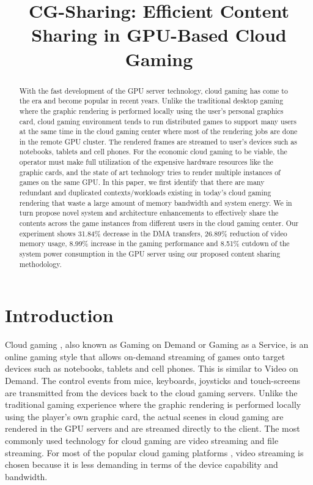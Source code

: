 \documentclass[pageno]{jpaper}
\begin{document}
\title{CG-Sharing: Efficient Content Sharing in GPU-Based Cloud Gaming}

\date{}
\maketitle


\begin{abstract}
With the fast development of the GPU server technology, cloud gaming has come to the era and become popular in recent years. Unlike the traditional desktop gaming where the graphic rendering is performed locally using the user's personal graphics card, cloud gaming environment tends to run distributed games to support many users at the same time in the cloud gaming center where most of the rendering jobs are done in the remote GPU cluster. The rendered frames are streamed to user's devices such as notebooks, tablets and cell phones. For the economic cloud gaming to be viable, the operator must make full utilization of the expensive hardware resources like the graphic cards, and the state of art technology tries to render multiple instances of games on the same GPU. In this paper, we first identify that there are many redundant and duplicated contexts/workloads existing in today's cloud gaming rendering that waste a large amount of memory bandwidth and system energy. We in turn propose novel system and architecture enhancements to effectively share the contents across the game instances from different users in the cloud gaming center. Our experiment shows 31.84\% decrease in the DMA transfers, 26.89\% reduction of video memory usage, 8.99\% increase in the gaming performance and 8.51\% cutdown of the system power consumption in the GPU server using our proposed content sharing methodology.
\end{abstract}

\section{Introduction}

Cloud gaming \cite{wiki}, also known as Gaming on Demand or Gaming as a Service, is an online gaming style that allows on-demand streaming of games onto target devices such as notebooks, tablets and cell phones. This is similar to Video on Demand. The control events from mice, keyboards, joysticks and touch-screens are transmitted from the devices back to the cloud gaming servers. Unlike the traditional gaming experience where the graphic rendering is performed locally using the player's own graphic card, the actual scenes in cloud gaming are rendered in the GPU servers and are streamed directly to the client. The most commonly used technology for cloud gaming are video streaming and file streaming. For most of the popular cloud gaming platforms \cite{OnLive}\cite{Gaikai}, video streaming is chosen because it is less demanding in terms of the device capability and bandwidth.
\end{document}
